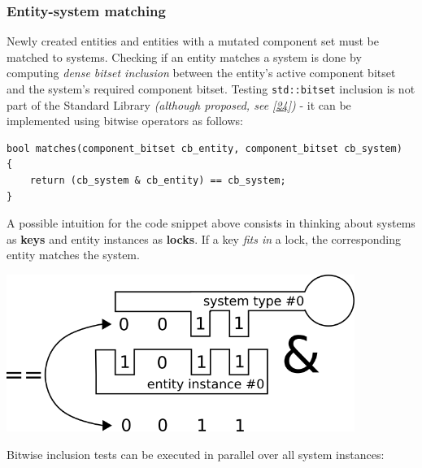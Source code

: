 \documentclass[oneside, 12pt, a4paper, openany]{book}
\let\origfigure=\figure
\let\endorigfigure=\endfigure
\renewenvironment{figure}[1][]{%
\origfigure[H]
}{%
\endorigfigure
}
\begin{document}
\subsubsection{Entity-system matching}\label{entity-system-matching}

Newly created entities and entities with a mutated component set must be
matched to systems. Checking if an entity matches a system is done by
computing \emph{dense bitset inclusion} between the entity's active
component bitset and the system's required component bitset. Testing
\texttt{std::bitset}
inclusion is not part of the Standard Library \emph{(although proposed,
see {[}\protect\hyperlink{ref-isocpp_proposal_p0125r0}{24}{]})} - it can
be implemented using bitwise operators as follows:

\begin{verbatim}
bool matches(component_bitset cb_entity, component_bitset cb_system)
{
    return (cb_system & cb_entity) == cb_system;
}
\end{verbatim}

A possible intuition for the code snippet above consists in thinking
about systems as \textbf{keys} and entity instances as \textbf{locks}.
If a key \emph{fits in} a lock, the corresponding entity matches the
system.

\begin{figure}
\centering
\includegraphics[width=0.85000\textwidth]{source/figures/keylock.png}
\caption{ECST flow: key/lock entity/system matching
intuition}\label{keylock}
\end{figure}

Bitwise inclusion tests can be executed in parallel over all system
instances:
\end{document}
